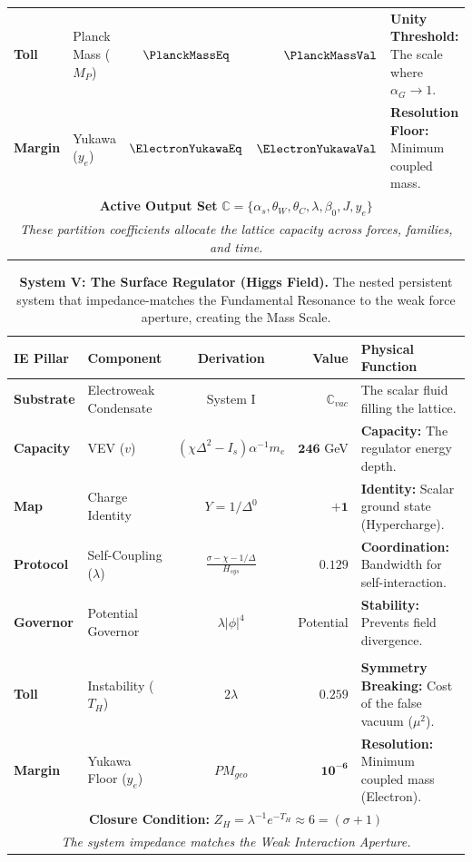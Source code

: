 \begin{table}[h]
\begin{tabular}{@{} l l c r l @{}}
\textbf{Toll} & Planck Mass ($M_P$) &
    $\PlanckMassEq$ & $\mathbf{\PlanckMassVal}$ & \textbf{Unity Threshold:} The scale where $\alpha_G \to 1$. \\
\textbf{Margin} & Yukawa ($y_e$) &
    $\ElectronYukawaEq$ & $\mathbf{\ElectronYukawaVal}$ & \textbf{Resolution Floor:} Minimum coupled mass. \\
\midrule
\multicolumn{5}{c}{\textbf{Active Output Set} $\mathbb{C} = \{ \alpha_s, \theta_W, \theta_C, \lambda, \beta_0, J, y_e \}$} \\
\multicolumn{5}{c}{\textit{These partition coefficients allocate the lattice capacity across forces, families, and time.}} \\
\midrule
\bottomrule
\end{tabular}
\end{table}

\begin{table}[h]
\centering
\caption{\textbf{System V: The Surface Regulator (Higgs Field).} The nested persistent system that impedance-matches the Fundamental Resonance to the weak force aperture, creating the Mass Scale.}
\label{tab:system_SurfaceRegulator}
\renewcommand{\arraystretch}{1.5}
\setlength{\tabcolsep}{6pt}
\begin{tabular}{@{} l l c r l @{}} 
\toprule
\textbf{IE Pillar} & \textbf{Component} & \textbf{Derivation} & \textbf{Value} & \textbf{Physical Function} \\
\midrule
\textbf{Substrate} & Electroweak Condensate & System I & $\mathbb{C}_{vac}$ & The scalar fluid filling the lattice. \\
\midrule
\textbf{Capacity} & VEV ($v$) & $(\chi \Delta^2 - I_s)\alpha^{-1}m_e$ & $\mathbf{246}$ GeV & \textbf{Capacity:} The regulator energy depth. \\
\textbf{Map} & Charge Identity & $Y=1/\Delta^0$ & $\mathbf{+1}$ & \textbf{Identity:} Scalar ground state (Hypercharge). \\
\textbf{Protocol} & Self-Coupling ($\lambda$) & $\frac{\sigma-\chi-1/\Delta}{H_{sys}}$ & $\mathbf{0.129}$ & \textbf{Coordination:} Bandwidth for self-interaction. \\
\textbf{Governor} & Potential Governor & $\lambda |\phi|^4$ & Potential & \textbf{Stability:} Prevents field divergence. \\
\addlinespace
\multicolumn{5}{l}{\textit{The Thermodynamic Cost}} \\
\textbf{Toll} & Instability ($T_H$) & $2\lambda$ & $\mathbf{0.259}$ & \textbf{Symmetry Breaking:} Cost of the false vacuum ($\mu^2$). \\
\textbf{Margin} & Yukawa Floor ($y_e$) & $PM_{geo}$ & $\mathbf{10^{-6}}$ & \textbf{Resolution:} Minimum coupled mass (Electron). \\
\midrule
\multicolumn{5}{c}{\textbf{Closure Condition:} $Z_H = \lambda^{-1} e^{-T_H} \approx 6 = (\sigma+1)$} \\
\multicolumn{5}{c}{\textit{The system impedance matches the Weak Interaction Aperture.}} \\
\bottomrule
\end{tabular}
\end{table}

